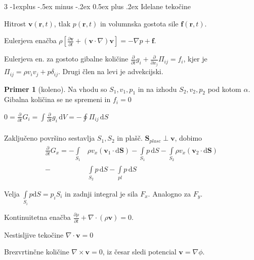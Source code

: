 \documentclass[10pt,landscape]{article}
\makeatletter
\renewcommand{\subsection}{\@startsection{subsection}{2}{0mm}%
	{-1explus -.5ex minus -.2ex}%
	{0.5ex plus .2ex}%
	{\normalfont\normalsize\bfseries}}
\theoremstyle{definition}
\newtheorem*{primer}{Primer}
\makeatother
\begin{document}
\begin{multicols}{3}
  \subsection{Idelane tekočine}

  Hitrost \( \mathbf{v}(\mathbf{r}, t) \), tlak \( p(\mathbf{r}, t) \) in volumnska gostota sile \( \mathbf{f}(\mathbf{r}, t) \).

  Eulerjeva enačba \( \rho \left[ \frac{\partial \mathbf{v}}{\partial t}  + \left( \mathbf{v} \cdot \nabla \right) \mathbf{v} \right] = - \nabla p + \mathbf{f} \).

  Eulerjeva en. za gostoto gibalne količine \( \frac{\partial }{\partial t}  g_i + \frac{\partial }{\partial x_{j}} \Pi_{ij} = f_i \), kjer je \( \Pi_{ij} = \rho v_i v_j + p \delta_{ij} \).
  Drugi člen na levi je advekcijski. 

  \begin{primer}[koleno]

    Na vhodu so \( S_1, v_1, p_1 \) in na izhodu \( S_2, v_2, p_2 \) pod kotom \( \alpha \).  Gibalna količina se ne spremeni in \( f_i = 0 \)

    \( 0 = \frac{\partial }{\partial t}  G_i = \int\limits_{}^{} \frac{\partial }{\partial t} g_i \, \mathrm{d} V = - \oint\limits_{}^{} \Pi_{ij} \, \mathrm{d} S \)

    Zaključeno površino sestavlja \( S_1, S_2 \) in plašč. \( \mathbf{S}_{plasc} \perp \mathbf{v} \), dobimo \vspace{-10pt}
    \begin{align*}
     \frac{\partial }{\partial t}G_x = - \int\limits_{S_1}^{} &\rho v_x \left( \mathbf{v}_1 \cdot \mathrm{d} \mathbf{S} \right) - \int\limits_{S_1}^{} p \, \mathrm{d} S - \int\limits_{S_2}^{} \rho v_x \left( \mathbf{v}_2 \cdot \mathrm{d} \mathbf{S} \right) \\ -& \int\limits_{S_2}^{} p \, \mathrm{d} S - \int\limits_{pl}^{} p \, \mathrm{d} S
    \end{align*}

    Velja \( \int\limits_{S_i}^{} p \mathrm{d} S = p_i S_i \) in zadnji integral je sila \( F_x \). Analogno za \( F_y \). 
    \end{primer}

  Kontinuitetna enačba \( \frac{\partial \rho}{\partial t}  + \nabla \cdot \left( \rho \mathbf{v} \right) = 0 \).

  Nestisljive tekočine \( \nabla \cdot \mathbf{v} = 0 \)

  Brezvrtinčne količine \( \nabla \times \mathbf{v} = 0 \), iz česar sledi potencial \( \mathbf{v} = \nabla \phi \).


\end{multicols}
\end{document}
